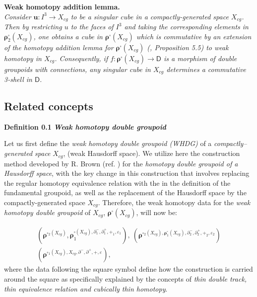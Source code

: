 \documentclass[12pt]{article}
\theoremstyle{plain}
\theoremstyle{definition}
\numberwithin{equation}{section}
\begin{document}
\textbf{Weak homotopy addition lemma.} \\
\emph{Consider $\textbf{u} : I^3 \to X _{cg}$ to be a singular cube in a compactly-generated 
space $X _{cg}$. Then by restricting \textbf{$u$} to the faces of $I^3$ and taking the 
corresponding elements in $\boldsymbol{\rho}^{\square}_2 (X_{cg})$, one obtains a cube in 
$\boldsymbol{\rho}^{\square} (X _{cg})$ which is commutative by an extension of the homotopy
addition lemma for $\boldsymbol{\rho}^{\square} (X_{cg})$ (\cite{BHKP}, Proposition 5.5) to 
\emph{weak homotopy} in $X _{cg}$. Consequently, if $f : \boldsymbol{\rho}^{\square} (X_{cg}) \to \mathsf{D}$ is a morphism of double groupoids with connections, any singular cube in $X_{cg}$ determines a commutative {3-shell} in $\mathsf{D}$.}

\subsection{Related concepts} 

\textbf{Definition 0.1} \emph{\textbf{Weak homotopy double groupoid}}

Let us first define the \emph{weak homotopy double groupoid (WHDG)} of a 
\emph{compactly--generated space} $X _{cg}$, (weak Hausdorff space). We utilize here the construction method developed by R. Brown (ref. \cite{BHKP}) for the \emph{homotopy double groupoid of a Hausdorff space}, with the key change in this construction that involves replacing the regular homotopy equivalence relation with the 
 in the definition of the fundamental groupoid, as well as the replacement of the Hausdorff space by the compactly-generated space $X_{cg}$. Therefore, the weak homotopy data for the \emph{weak homotopy double groupoid} of $X_{cg}$, $\boldsymbol{\rho}^{\square} (X_{cg})$, will now be: 

 \[
\begin{array}{c}
(\boldsymbol{\rho}^{{\square}_{2} (X _{cg})} , \boldsymbol{\rho}_1^{\square (X _{cg}) ,
\partial^{-}_{1} , \partial^{+}_{1} , +_{1} , \varepsilon _{1}}) ,
\ (\boldsymbol{\rho}^{{\square}_{2} (X _{cg}), \boldsymbol{\rho}^\square_1 (X _{cg}) ,
\partial^{-}_{2} , \partial^{+}_{2} , +_{2} , \varepsilon _{2}} )\\[3mm]
(\boldsymbol{\rho}^{\square_1 (X _{cg}) , X _{cg} , \partial^{-} ,
\partial^{+} , + , \varepsilon }),
\end{array}\]
\bigbreak
where the data following the square symbol define how the construction is carried around the square as specifically 
explained by the concepts of \emph{thin double track, thin equivalence relation and cubically thin homotopy}. 
\end{document}

